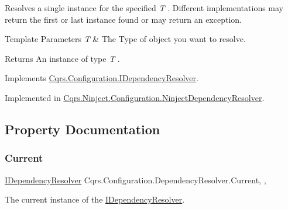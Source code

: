 Resolves a single instance for the specified {\itshape T} . Different implementations may return the first or last instance found or may return an exception. 


\begin{DoxyTemplParams}{Template Parameters}
{\em T} & The Type of object you want to resolve.\\
\hline
\end{DoxyTemplParams}
\begin{DoxyReturn}{Returns}
An instance of type {\itshape T} .
\end{DoxyReturn}


Implements \hyperlink{interfaceCqrs_1_1Configuration_1_1IDependencyResolver_a9dc7694a365209a5ef05270a7cfa7b6b_a9dc7694a365209a5ef05270a7cfa7b6b}{Cqrs.\+Configuration.\+I\+Dependency\+Resolver}.



Implemented in \hyperlink{classCqrs_1_1Ninject_1_1Configuration_1_1NinjectDependencyResolver_ab044ba98051bdd3111e0c1be6259de10_ab044ba98051bdd3111e0c1be6259de10}{Cqrs.\+Ninject.\+Configuration.\+Ninject\+Dependency\+Resolver}.



\subsection{Property Documentation}
\mbox{\label{classCqrs_1_1Configuration_1_1DependencyResolver_aaede4bbd564000f2becf65e8be863fff_aaede4bbd564000f2becf65e8be863fff}} 
\subsubsection{\texorpdfstring{Current}{Current}}
{\footnotesize\ttfamily \hyperlink{interfaceCqrs_1_1Configuration_1_1IDependencyResolver}{I\+Dependency\+Resolver} Cqrs.\+Configuration.\+Dependency\+Resolver.\+Current\hspace{0.3cm}{\ttfamily [static]}, {\ttfamily [get]}, {}}



The current instance of the \hyperlink{interfaceCqrs_1_1Configuration_1_1IDependencyResolver}{I\+Dependency\+Resolver}. 

